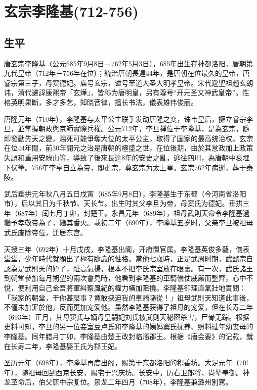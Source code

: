 
\section{玄宗李隆基\tiny(712-756)}

\subsection{生平}

唐玄宗李隆基（公元685年9月8日－762年5月3日），685年出生在神都洛阳，唐朝第九代皇帝（712年－756年在位）；統治唐朝長達44年，是唐朝在位最久的皇帝，唐睿宗第三子，母窦德妃。庙号玄宗，谥号至道大圣大明孝皇帝。宋代避聖祖趙玄朗讳，清代避諱康熙帝「玄燁」，皆称为唐明皇，另有尊号“开元圣文神武皇帝”。性格英明果断，多才多艺，知晓音律，擅长书法，儀表雄伟俊丽。

唐隆元年（710年），李隆基与太平公主联手发动唐隆之变，诛韦皇后，擁立睿宗李旦，並掌握朝政與京師實際兵權。公元712年，李旦禅位于李隆基，是為玄宗，隨即發動先天之變，赐死可能爭奪大位的太平公主，取得了国家的最高统治权。玄宗在位44年間，前30年開元之治是唐朝的極盛之世，在位後期，由於其怠政加上政策失誤和重用安祿山等，導致了後來長達8年的安史之亂，逃往四川，為唐朝中衰埋下伏筆。756年李亨自立為帝，即肅宗，尊玄宗为太上皇。玄宗762年病逝，葬于泰陵。

武后垂拱元年秋八月五日戊寅（685年9月8日），李隆基生于东都（今河南省洛阳市），后以其日为千秋节、天长节。出生时其父李旦为帝，母窦氏为德妃。垂拱三年（687年）闰七月丁卯，封楚王。永昌元年（689年），祖母武則天命令李隆基過繼予孝敬帝為子，繼其香火。載初二年（690年），李隆基五岁时，父亲李旦被祖母武氏废除帝位，迁居东宫。

天授三年（692年）十月戊戌，李隆基出阁，开府置官属。李隆基英俊多藝，儀表堂堂，少年時代就顯出了極有膽識的性格。當他七歲時，正是武周时期，武懿宗自認為是武則天的姪子，趾高氣揚，根本不把李氏宗室放在眼裏。有一次，武氏諸王到朝堂參加每月朔望的兩次會見時，他看到李隆基的車騎儀仗威嚴而整齊，心中不悅，便利用自己金吾將軍糾察風紀的權力橫加阻撓。李隆基卻理直氣壯地責問：「我家的朝堂，干你甚麼事？竟敢挾迫我的車騎隨從！」祖母武則天知道此事後，不僅未加罪於他，反而更加宠爱他。虽然李隆基获得了祖母的宠爱，但在长寿二年（693年）正月，其母窦氏与嫡母皇嗣妃刘氏被武则天秘密杀害，尸骨无踪。根据史料可知，李旦的另一位妾室豆卢氏和李隆基的姨妈窦氏抚养、照料过年幼丧母的李隆基。同年腊月丁卯，李隆基由楚王改封临淄郡王。根据《唐会要》的记载，就在长寿二年，李隆基娶王氏为郡王妃。

圣历元年（698年），李隆基再度出阁，赐第于东都洛阳的积善坊。大足元年（701年），随祖母回到西京长安，赐宅于兴庆坊。长安中，历右卫郎将、尚辇奉御。神龙革命后，伯父唐中宗复位。景龙二年四月（708年），李隆基兼潞州別駕。

